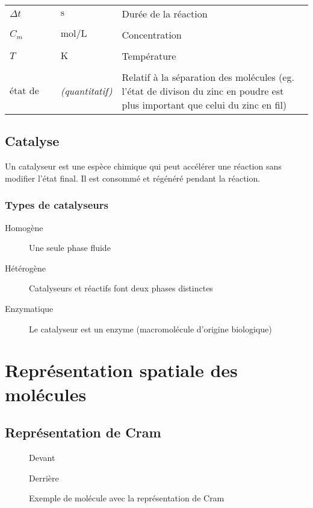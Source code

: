 \documentclass{article}
\newcommand{\deftable}[2]{%
\begin{table}[h]
    \centering
    \begin{tabular}{llp{100mm}}%
        #1
    \end{tabular}
    \label{tab:#2_units}
\end{table}%
}
\newcommand{\deftablevar}[3]{%
    $#1$ & $\si{#2}$ & #3 \\
}
\newcommand{\deftableobj}[3]{%
    $#1$ & \textit{#2} & #3 \\
}
\begin{document}
\deftable{
	\deftablevar{\Delta t}{\second}{Durée de la réaction} \\
	\deftablevar{C_m}{\mol\per\liter}{Concentration} \\
	\deftablevar{T}{\kelvin}{Température} \\
	\deftableobj{\text{état de division}}{(quantitatif)}{Relatif à la séparation des molécules (eg. l'état de divison du zinc en poudre est plus important que celui du zinc en fil)}
}{feacteurs_cinetiques}

\subsection{Catalyse}
Un catalyseur est une espèce chimique qui peut accélérer une réaction sans modifier l'état final. Il est consommé et régénéré pendant la réaction.

\subsubsection{Types de catalyseurs}
\begin{description}
    \item[Homogène] Une seule phase fluide
    \item[Hétérogène] Catalyseurs et réactifs font deux phases distinctes
    \item[Enzymatique] Le catalyseur est un enzyme (macromolécule d'origine biologique)
\end{description}

\newpage\section{Représentation spatiale des molécules}

\subsection{Représentation de Cram}

\begin{description}
    \item[] Devant
    \item[] Derrière
\end{description}

\begin{figure}[h]
    \centering
    \caption{Exemple de molécule avec la représentation de Cram}
    \label{fig:cram_example}
\end{figure}
\end{document}
